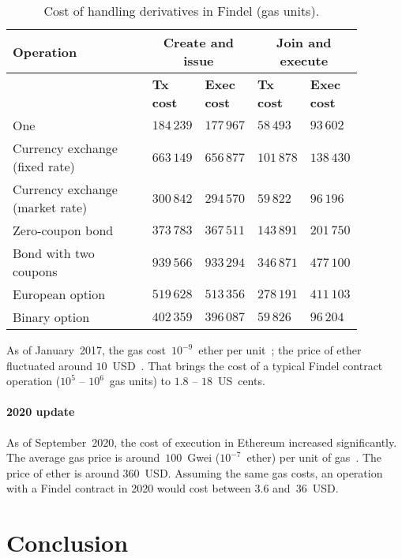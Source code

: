 \begin{table}
	\centering
	\caption{Cost of handling derivatives in Findel (gas units).}
	\begin{tabular}{|p{0.4\linewidth}|p{0.12\linewidth}|p{0.12\linewidth}|p{0.12\linewidth}|p{0.12\linewidth}|}
		\hline
		\textbf{Operation} & \multicolumn{2}{|c|}{\textbf{Create and issue}} & \multicolumn{2}{|c|}{\textbf{Join and execute}}\\
		\hline
		& \textbf{Tx cost} & \textbf{Exec cost} & \textbf{Tx cost} & \textbf{Exec cost} \\
		\hline
		One & $184\,239$ & $177\,967$ & $58\,493$ & $93\,602$ \\
		\hline
		Currency exchange (fixed rate) & $663\,149$ & $656\,877$ & $101\,878$ & $138\,430$ \\
		\hline
		Currency exchange (market rate) & $300\,842$ & $294\,570$ & $59\,822$ & $96\,196$ \\
		\hline
		Zero-coupon bond & $373\,783$ & $367\,511$ & $143\,891$ & $201\,750$ \\
		\hline
		Bond with two coupons & $939\,566$ & $933\,294$ & $346\,871$ & $477\,100$ \\
		\hline
		European option & $519\,628$ & $513\,356$ & $278\,191$ & $411\,103$ \\
		\hline
		Binary option & $402\,359$ & $396\,087$ & $59\,826$ & $96\,204$ \\
		\hline
	\end{tabular}
	\label{tab:Ch10FindelCost2}
\end{table}

As of January~2017, the gas cost~$10^{-9}$~ether per unit~\cite{Ethstats}; the price of ether fluctuated around $10$~USD~\cite{Worldcoinindex}.
That brings the cost of a typical Findel contract operation ($10^5$ -- $10^6$~gas units) to $1.8$ -- $18$~US~cents.

\paragraph{2020 update}
As of September~2020, the cost of execution in Ethereum increased significantly.
The average gas price is around~$100$~Gwei ($10^{-7}$~ether) per unit of gas~\cite{EGS}.
The price of ether is around $360$~USD\@.
Assuming the same gas costs, an operation with a Findel contract in 2020 would cost between $3.6$ and~$36$~USD\@.


\section{Conclusion}

